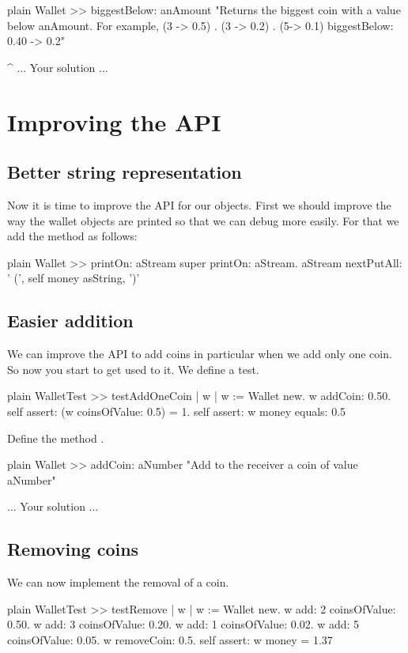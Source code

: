 \documentclass[10pt,twoside,english]{_support/latex/sbabook/sbabook}
\begin{document}
\begin{displaycode}{plain}
Wallet >> biggestBelow: anAmount
	"Returns the biggest coin with a value below anAmount. For example, {(3 -> 0.5) . (3 -> 0.2) . (5-> 0.1)} biggestBelow: 0.40 -> 0.2"
	
	^ ... Your solution ...
\end{displaycode}
\section{Improving the API}\subsection{Better string representation}
Now it is time to improve the API for our objects. First we should improve the way the wallet objects are printed so that we can debug more easily. For that we add the method  as follows:

\begin{displaycode}{plain}
Wallet >> printOn: aStream
	super printOn: aStream.
	aStream nextPutAll: ' (', self money asString, ')'
\end{displaycode}
\subsection{Easier addition}
We can improve the API to add coins in particular when we add only one coin. 
So now you start to get used to it. We define a test. 

\begin{displaycode}{plain}
WalletTest >> testAddOneCoin
	| w |
	w := Wallet new.
	w addCoin: 0.50.
	self assert: (w coinsOfValue: 0.5) = 1.
	self assert: w money equals: 0.5
\end{displaycode}

Define the method .

\begin{displaycode}{plain}
Wallet >> addCoin: aNumber
	"Add to the receiver a coin of value aNumber"
	
	... Your solution ...
\end{displaycode}
\subsection{Removing coins}
We can now implement the removal of a coin. 

\begin{displaycode}{plain}
WalletTest >> testRemove
	| w |
	w := Wallet new.
	w add: 2 coinsOfValue: 0.50.
	w add: 3 coinsOfValue: 0.20.
	w add: 1 coinsOfValue: 0.02.
	w add: 5 coinsOfValue: 0.05.
	w removeCoin: 0.5.
	self assert: w money = 1.37
\end{displaycode}
\end{document}
